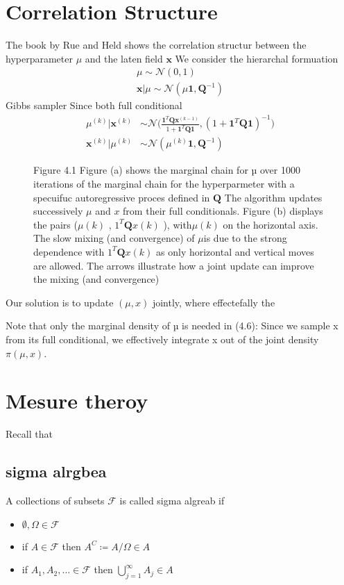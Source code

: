 \chapter{Correlation Structure}
\label{ap:Correlatation}
The book by Rue and Held shows the correlation structur between the hyperparameter $\mu$ and the laten field $\bm{x}$
We consider the hierarchal formuation 
\begin{align}
	\mu \sim \mathcal{N}(0,1)\\
	\bm{x}|\mu \sim \mathcal{N}(\mu\bm{1},\bm{Q}^{-1})
\end{align}
Gibbs sampler Since both full conditional
\begin{align}
	\mu^{(k)} | \bm{x}^{(k)} &\sim \mathcal{N} \Bigg(\frac{\bm{1}^T\bm{Q}\bm{x}^{(k-1)}}{1 + \bm{1}^T\bm{Q}\bm{1}}, (1 + \bm{1}^T\bm{Q}\bm{1})^{-1} \Bigg)\\
	\bm{x}^{(k)} | \mu^{(k)} &\sim \mathcal{N} (	\mu^{(k)}\bm{1}, \bm{Q}^{-1})
\end{align}

\begin{figure}[ht!]
	\centering
	
	\caption[Correlation structur]{Figure 4.1 Figure (a) shows the marginal chain for µ over 1000 iterations of
		the marginal chain for the hyperparmeter with a specuifuc autoregressive proces defined in $\bm{Q}$ The algorithm
		updates successively $\mu$ and $x$ from their full conditionals. Figure (b) displays
		the pairs ($\mu(k)$ ,  $1^T\bm{Q}x(k)$ ), with$\mu(k)$ on the horizontal axis. The slow mixing
		(and convergence) of $\mu$is due to the strong dependence with $1^T\bm{Q}x(k)$  as only
		horizontal and vertical moves are allowed. The arrows illustrate how a joint
		update can improve the mixing (and convergence)}
	\label{fig:FirstDAG}
\end{figure}

Our solution is to update $(\mu, x)$ jointly, where effectefally the 

Note that only the marginal density of µ is needed in (4.6): Since we
sample x from its full conditional, we eﬀectively integrate x out of the
joint density $\pi(\mu, x)$.


\chapter{Mesure theroy}
\label{ap:Correlatation}
Recall that
\section{sigma alrgbea}
A collections of subsets $\mathcal{F}$ is called sigma algreab if
\begin{itemize}
	\item $\emptyset, \Omega \in \mathcal{F} $
	\item if $A \in \mathcal{F} $ then $A^C \coloneqq A / \Omega \in A$
	\item if $A_1 , A_2, \dots  \in \mathcal{F} $ then $ \bigcup_{j=1}^{\infty} A_j \in A$
\end{itemize}
